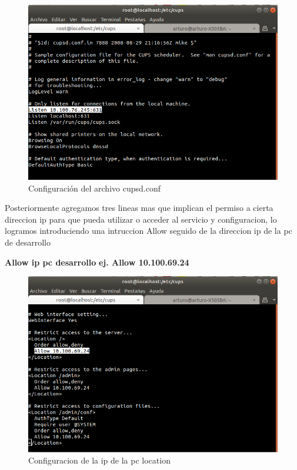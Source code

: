 \FloatBarrier
\begin{figure}[htbp!]
		\centering
			\includegraphics[width=.9\textwidth]{images/r5}
		\caption{Configuración del archivo cupsd.conf}
		\label{image:r}
\end{figure}
\FloatBarrier
Posteriormente agregamos tres lineas mas que implican el permiso a cierta direccion ip para que pueda utilizar o acceder al servicio y configuracion, lo logramos introduciendo una intruccion Allow seguido de la direccion ip de la pc de desarrollo
\\
\begin{center}
						\textbf{Allow ip pc desarrollo}
						\textbf{ej. Allow 10.100.69.24}
\end {center}
\FloatBarrier
\begin{figure}[htbp!]
		\centering
			\includegraphics[width=.9\textwidth]{images/r6_1}
		\caption{Configuracion de la ip de la pc location}
		\label{image:r6_1}
\end{figure}
\FloatBarrier

